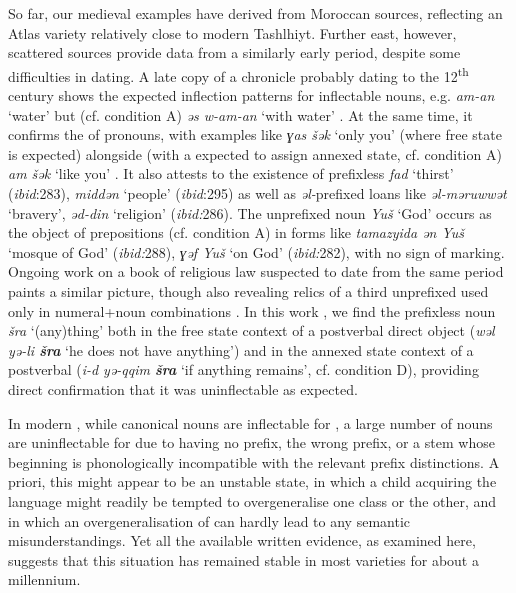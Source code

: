 \documentclass[output=paper,colorlinks,citecolor=brown]{langscibook}
\begin{document}
So far, our medieval examples have derived from Moroccan sources, reflecting an Atlas variety relatively close to modern Tashlhiyt. Further east, however, scattered  sources provide data from a similarly early period, despite some difficulties in dating. A late copy of a chronicle probably dating to the 12\textsuperscript{th} century shows the expected inflection patterns for inflectable nouns, e.g. \emph{am-an} `water' but (cf. condition A) \emph{əs w-am-an} `with water' \citep[288--289]{lewicki1934}. At the same time, it confirms the  of pronouns, with examples like \emph{ɣas šək} `only you' (where free state is expected) alongside (with a  expected to assign annexed state, cf. condition A) \emph{am šək} `like you' \citep[280--281]{lewicki1934}. It also attests to the existence of prefixless \emph{fad} `thirst' (\emph{ibid}:283), \emph{middən} `people' (\emph{ibid}:295) as well as \emph{əl-}prefixed  loans like \emph{əl-məruwwət} `bravery', \emph{əd-din} `religion' (\emph{ibid:}286). The unprefixed noun \emph{Yuš} `God' occurs as the object of prepositions (cf. condition A) in forms like \emph{tamazyida ən Yuš} `mosque of God' (\emph{ibid:}288), \emph{ɣəf Yuš} `on God' (\emph{ibid:}282), with no sign of  marking. Ongoing work on a book of religious law suspected to date from the same period paints a similar picture, though also revealing relics of a third unprefixed \textit{} used only in numeral+noun combinations \citep{brugnatelli2011}. In this work \citep[75--77]{calassanti-motylinski1905}, we find the prefixless noun \emph{šra} `(any)thing' both in the free state context of a postverbal direct object (\emph{wəl yə-li \textbf{šra}} `he does not have anything') and in the annexed state context of a postverbal  (\emph{i-d yə-qqim \textbf{šra}} `if anything remains', cf. condition D), providing direct confirmation that it was uninflectable as expected.

In modern , while canonical nouns are inflectable for , a large number of nouns are uninflectable for  due to having no prefix, the wrong prefix, or a stem whose beginning is phonologically incompatible with the relevant prefix distinctions. A priori, this might appear to be an unstable state, in which a child acquiring the language might readily be tempted to overgeneralise one class or the other, and in which an overgeneralisation of  can hardly lead to any semantic misunderstandings. Yet all the available written evidence, as examined here, suggests that this situation has remained stable in most varieties for about a millennium.
\end{document}
